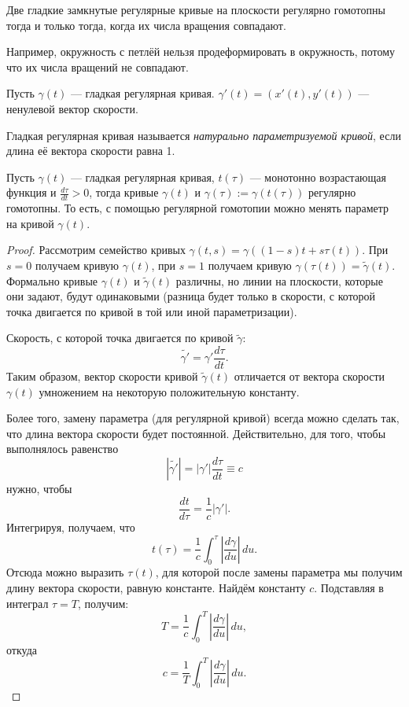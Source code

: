 \begin{theorem}[Уитни]
    Две гладкие замкнутые регулярные кривые на плоскости регулярно гомотопны тогда и только тогда, когда их числа вращения совпадают.
\end{theorem}

Например, окружность с петлёй нельзя продеформировать в окружность, потому что их числа вращений не совпадают.

Пусть $\gamma(t)$ — гладкая регулярная кривая. $\gamma'(t) = (x'(t), y'(t))$ — ненулевой вектор скорости.

\begin{definition}
    Гладкая регулярная кривая называется \textit{натурально параметризуемой кривой}, если длина её вектора скорости равна 1.
\end{definition} 



\begin{statement}
    Пусть $\gamma(t)$ — гладкая регулярная кривая, $t(\tau)$ — монотонно возрастающая функция и $\frac{d\tau}{dt} > 0$, тогда кривые $\gamma(t)$ и $\gamma(\tau):= \gamma(t(\tau))$ регулярно гомотопны. То есть, с помощью регулярной гомотопии можно менять параметр на кривой $\gamma(t)$.
\end{statement} 
\begin{proof}
    Рассмотрим семейство кривых $\gamma(t,s) = \gamma\left((1-s)t + s \tau(t)\right)$.
    При $s=0$ получаем кривую $\gamma(t)$, при $s=1$ получаем кривую $\gamma(\tau(t)) = \tilde{\gamma}(t)$.
    Формально кривые $\gamma(t)$ и $\tilde{\gamma}(t)$ различны, но линии на плоскости, которые они задают, будут одинаковыми (разница будет только в скорости, с которой точка двигается по кривой в той или иной параметризации).

    Скорость, с которой точка двигается по кривой $\tilde{\gamma}$:
    \[\tilde{\gamma'} = \gamma' \frac{d\tau}{dt}.\]
    Таким образом, вектор скорости кривой $\tilde{\gamma}(t)$ отличается от вектора скорости $\gamma(t)$ умножением на некоторую положительную константу.

    Более того, замену параметра (для регулярной кривой) всегда можно сделать так, что длина вектора скорости будет постоянной. Действительно, для того, чтобы выполнялось равенство
    \[|\tilde{\gamma'}| = |\gamma'|\frac{d\tau}{dt} \equiv c\]
    нужно, чтобы
    \[\frac{dt}{d\tau} = \frac{1}{c}|\gamma'|.\]
    Интегрируя, получаем, что
    \[t(\tau) = \frac{1}{c} \int_{0}^{\tau} \left|\frac{d\gamma}{du}\right| \, du.\]
    Отсюда можно выразить $\tau(t)$, для которой после замены параметра мы получим длину вектора скорости, равную константе. Найдём константу $c$.
    Подставляя в интеграл $\tau = T$, получим:
    \[T = \frac{1}{c} \int_{0}^{T}\left|\frac{d\gamma}{du}\right| \, du,\]
    откуда
    \[c = \frac{1}{T} \int_{0}^{T}\left|\frac{d\gamma}{du}\right| \, du.\]
\end{proof} 
